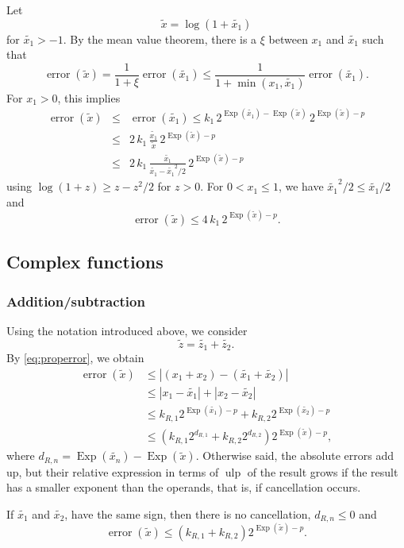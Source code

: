 \documentclass [11pt]{article}
\newcommand {\corr}[1]{{#1}}
\newcommand {\appro}[1]{\widetilde {#1}}
\newcommand {\Ulp}{{\operatorname {ulp}}}
\DeclareMathOperator{\Exp}{\operatorname {Exp}}
\newcommand{\error}{\operatorname {error}}
\renewcommand {\leq}{\leqslant}
\renewcommand {\geq}{\geqslant}
\begin{document}
Let
\[
\appro x = \log (1 + \appro {x_1})
\]
for $\appro {x_1} > -1$.
By the mean value theorem, there is a $\xi$ between $x_1$ and $\appro {x_1}$
such that
\[
\error (\appro x) = \frac {1}{1 + \xi} \error (\appro {x_1})
\leq \frac {1}{1 + \min (x_1, \appro {x_1})} \error (\appro {x_1}).
\]
For $x_1 > 0$, this implies
\begin {eqnarray*}
\error (\appro x)
& \leq & \error (\appro {x_1})
\leq
k_1 \, 2^{\Exp (\appro {x_1}) - \Exp (\appro x)}
\, 2^{\Exp (\appro x) - p} \\
& \leq & 2 \, k_1 \, \frac {\appro {x_1}}{\appro x} \, 2^{\Exp (\appro x) - p} \\
& \leq & 2 \, k_1 \, \frac {\appro {x_1}}{\appro {x_1} - \appro {x_1}^2/2}
\, 2^{\Exp (\appro x) - p}
\end {eqnarray*}
using $\log (1 + z) \geq z - z^2/2$ for $z > 0$.
For $0 < x_1 \leq 1$, we have $\appro {x_1}^2/2 \leq \appro {x_1}/2$ and
\[
\error (\appro x)
\leq 4 \, k_1 \, 2^{\Exp (\appro x) - p}.
\]


\subsection {Complex functions}

\subsubsection {Addition/subtraction}
\label {sssec:propadd}

Using the notation introduced above, we consider
\[
\appro z = \appro {z_1} + \appro {z_2}.
\]
By \eqref {eq:properror}, we obtain
\begin{align*}
\error (\appro x)
& \leq | (\corr {x_1} + \corr {x_2}) - (\appro {x_1} + \appro {x_2})|
\\
& \leq | \corr {x_1} - \appro {x_1} | + | \corr {x_2} - \appro {x_2}|
\\
& \leq k_{R,1} 2^{\Exp (\appro {x_1}) - p}
+ k_{R,2} 2^{\Exp (\appro {x_2}) - p}
\\
& \leq \left( k_{R,1} 2^{d_{R,1}} + k_{R,2} 2^{d_{R,2}} \right)
2^{\Exp (\appro x) - p},
\end{align*}
where $d_{R,n}=\Exp(\appro {x_n})-\Exp(\appro x)$.
Otherwise said, the absolute errors add up, but their relative expression
in terms of $\Ulp$ of the result grows if the result has a smaller
exponent than the operands, that is, if cancellation occurs.

If $\appro {x_1}$ and $\appro {x_2}$, have the same sign, then there
is no cancellation, $d_{R, n} \leq 0$ and
\[
\error (\appro x) \leq (k_{R,1} + k_{R,2}) 2^{\Exp (\appro x) - p}.
\]
\end{document}
